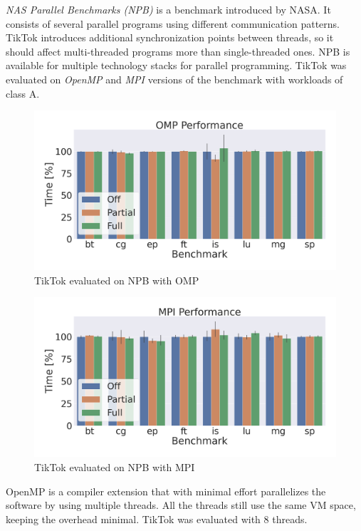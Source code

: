 \documentclass[conference]{IEEEtran}
\newcommand{\sysname}{TikTok}
\begin{document}
\emph{NAS Parallel Benchmarks (NPB)} is a benchmark introduced by NASA. It
consists of several parallel programs using different communication patterns.
\sysname{} introduces additional synchronization points between threads, so it
should affect multi-threaded programs more than single-threaded ones. NPB is
available for multiple technology stacks for parallel programming. \sysname{}
was evaluated on \emph{OpenMP} and \emph{MPI} versions of the benchmark
with workloads of class A.

\begin{figure}[]
  \centering
  \includegraphics[width=\linewidth]{graphs/omp.png}
  \caption{\sysname{} evaluated on NPB with OMP}
  \label{fig:npbomp}
\end{figure}

\begin{figure}[]
  \centering
  \includegraphics[width=\linewidth]{graphs/mpi.png}
  \caption{\sysname{} evaluated on NPB with MPI}
  \label{fig:npbmpi}
\end{figure}

OpenMP is a compiler extension that with minimal effort parallelizes the software
by using multiple threads. All the threads still use the same VM space, keeping
the overhead minimal. \sysname{} was evaluated with 8 threads.
\end{document}
